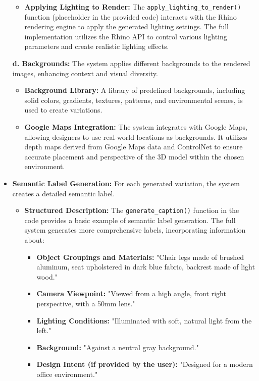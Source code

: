 \documentclass{article}
\begin{document}
\begin{itemize}
\begin{itemize}
    \item \textbf{Applying Lighting to Render:} The \texttt{apply\_lighting\_to\_render()} function (placeholder in the provided code) interacts with the Rhino rendering engine to apply the generated lighting settings. The full implementation utilizes the Rhino API to control various lighting parameters and create realistic lighting effects.
\end{itemize}

\textbf{d. Backgrounds:} The system applies different backgrounds to the rendered images, enhancing context and visual diversity.

\begin{itemize}
    \item \textbf{Background Library:} A library of predefined backgrounds, including solid colors, gradients, textures, patterns, and environmental scenes, is used to create variations.

    \item \textbf{Google Maps Integration:} The system integrates with Google Maps, allowing designers to use real-world locations as backgrounds. It utilizes depth maps derived from Google Maps data and ControlNet to ensure accurate placement and perspective of the 3D model within the chosen environment.
\end{itemize}

\item \textbf{Semantic Label Generation:} For each generated variation, the system creates a detailed semantic label.

\begin{itemize}
    \item \textbf{Structured Description:} The \texttt{generate\_caption()} function in the code provides a basic example of semantic label generation. The full system generates more comprehensive labels, incorporating information about:
    \begin{itemize}
        \item \textbf{Object Groupings and Materials:} "Chair legs made of brushed aluminum, seat upholstered in dark blue fabric, backrest made of light wood."
        \item \textbf{Camera Viewpoint:} "Viewed from a high angle, front right perspective, with a 50mm lens."
        \item \textbf{Lighting Conditions:} "Illuminated with soft, natural light from the left."
        \item \textbf{Background:} "Against a neutral gray background."
        \item \textbf{Design Intent (if provided by the user):} "Designed for a modern office environment."
    \end{itemize}
\end{itemize}


\end{itemize}
\end{document}
